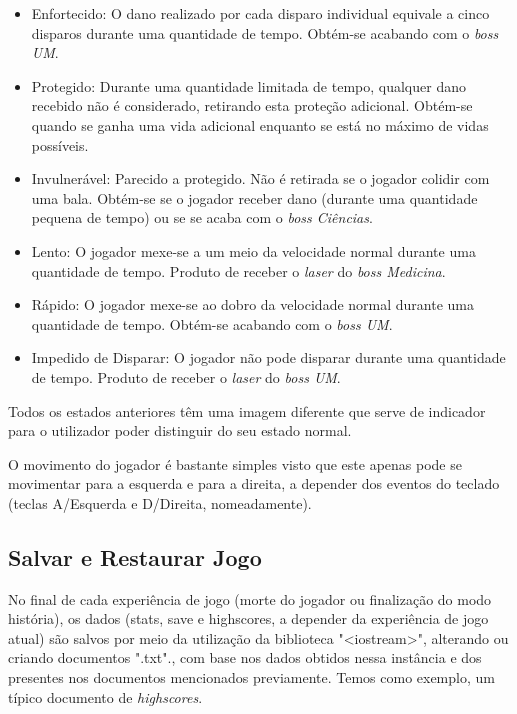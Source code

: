 \documentclass[a4paper,11pt]{article}
\begin{document}
\begin{itemize}
    \item  Enfortecido: O dano realizado por cada disparo individual equivale a cinco disparos durante uma quantidade de tempo. Obtém-se acabando com o \textit{boss UM}.
    \item  Protegido: Durante uma quantidade limitada de tempo, qualquer dano recebido não é considerado, retirando esta proteção adicional. Obtém-se quando se ganha uma vida adicional enquanto se está no máximo de vidas possíveis.
    \item Invulnerável: Parecido a protegido. Não é retirada se o jogador colidir com uma bala. Obtém-se se o jogador receber dano (durante uma quantidade pequena de tempo) ou se se acaba com o \textit{boss Ciências}.
    \item Lento: O jogador mexe-se a um meio da velocidade normal durante uma quantidade de tempo. Produto de receber o \textit{laser} do \textit{boss Medicina}.
    \item Rápido: O jogador mexe-se ao dobro da velocidade normal durante uma quantidade de tempo. Obtém-se acabando com o \textit{boss UM}.
    \item Impedido de Disparar: O jogador não pode disparar durante uma quantidade de tempo. Produto de receber o \textit{laser} do \textit{boss UM}.
\end{itemize}

\vspace{8pt}

Todos os estados anteriores têm uma imagem diferente que serve de indicador para o utilizador poder distinguir do seu  estado normal.

\vspace{8pt}

O movimento do jogador é bastante simples visto que este apenas pode se movimentar para a esquerda e para a direita, a depender dos eventos do teclado (teclas A/Esquerda e D/Direita, nomeadamente).

\vspace{8pt}

\subsection{Salvar e Restaurar Jogo}

\vspace{8pt}

No final de cada experiência de jogo (morte do jogador ou finalização do modo história), os dados (stats, save e highscores, a depender da experiência de jogo atual) são salvos por meio da utilização da biblioteca "<iostream>", alterando ou criando documentos ".txt"., com base nos dados obtidos nessa instância e dos presentes nos documentos mencionados previamente. Temos como exemplo, um típico documento de \textit{highscores}.
\end{document}

